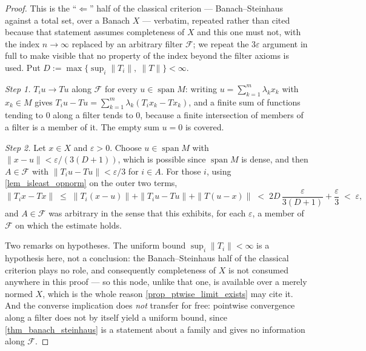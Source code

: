 \documentclass[a4paper]{report}
\theoremstyle{plain}
\theoremstyle{definition}
\theoremstyle{remark}
\begin{document}
\begin{proof}
  This is the ``$\Leftarrow$'' half of the classical criterion --- Banach--Steinhaus against
  a total set, over a Banach $X$ --- verbatim, repeated rather than cited because that
  statement assumes completeness of $X$ and this one must not, with
  the index
  $n \to \infty$ replaced by an arbitrary filter $\mathcal{F}$; we repeat the
  $3\varepsilon$ argument in full to make visible that no property of the index beyond the
  filter axioms is used.  Put $D := \max\{\sup_{i}\|T_i\|,\ \|T\|\} < \infty$.

  \emph{Step 1.}  $T_iu \to Tu$ along $\mathcal{F}$ for every $u \in \operatorname{span}M$:
  writing $u = \sum_{k=1}^m\lambda_kx_k$ with $x_k \in M$ gives
  $T_iu - Tu = \sum_{k=1}^m \lambda_k(T_ix_k - Tx_k)$, and a finite sum of functions
  tending to $0$ along a filter tends to $0$, because a finite intersection of members of a
  filter is a member of it.  The empty sum $u = 0$ is covered.

  \emph{Step 2.}  Let $x \in X$ and $\varepsilon > 0$.  Choose $u \in \operatorname{span}M$
  with $\|x - u\| < \varepsilon/(3(D+1))$, which is possible since $\operatorname{span}M$
  is dense, and then $A \in \mathcal{F}$ with $\|T_iu - Tu\| < \varepsilon/3$ for $i \in A$.
  For those $i$, using \cref{lem_isleast_opnorm} on the outer two terms,
  \[
    \|T_ix - Tx\| \;\le\; \|T_i(x-u)\| + \|T_iu - Tu\| + \|T(u-x)\|
      \;<\; 2D\,\frac{\varepsilon}{3(D+1)} + \frac{\varepsilon}{3} \;<\; \varepsilon ,
  \]
  and $A \in \mathcal{F}$ was arbitrary in the sense that this exhibits, for each
  $\varepsilon$, a member of $\mathcal{F}$ on which the estimate holds.

  Two remarks on hypotheses.  The uniform bound $\sup_i\|T_i\| < \infty$ is a hypothesis
  here, not a conclusion: the Banach--Steinhaus half of the classical criterion plays no
  role, and consequently completeness of $X$ is not consumed anywhere in this proof --- so
  this node, unlike that one, is available over a merely normed $X$, which
  is the whole reason \cref{prop_ptwise_limit_exists} may cite it.  And the converse
  implication does \emph{not} transfer for free: pointwise convergence along a filter does
  not by itself yield a uniform bound, since \cref{thm_banach_steinhaus} is a statement
  about a family and gives no information along $\mathcal{F}$.
\end{proof}
\end{document}
